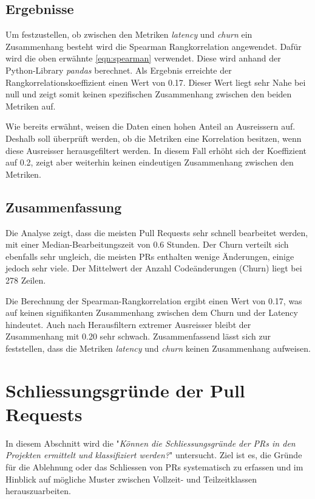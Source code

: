 \subsection{Ergebnisse}
Um festzustellen, ob zwischen den Metriken \textit{latency} und \textit{churn} ein Zusammenhang besteht wird die Spearman Rangkorrelation angewendet. Dafür wird die oben erwähnte \autoref{eqn:spearman} verwendet. Diese wird anhand der Python-Library \textit{pandas} berechnet. Als Ergebnis erreichte der Rangkorrelationskoeffizient einen Wert von 0.17. Dieser Wert liegt sehr Nahe bei null und zeigt somit keinen spezifischen Zusammenhang zwischen den beiden Metriken auf. 

Wie bereits erwähnt, weisen die Daten einen hohen Anteil an Ausreissern auf. Deshalb soll überprüft werden, ob die Metriken eine Korrelation besitzen, wenn diese Ausreisser herausgefiltert werden. In diesem Fall erhöht sich der Koeffizient auf 0.2, zeigt aber weiterhin keinen eindeutigen Zusammenhang zwischen den Metriken.

\subsection{Zusammenfassung}
Die Analyse zeigt, dass die meisten Pull Requests sehr schnell bearbeitet werden, mit einer Median-Bearbeitungszeit von 0.6 Stunden. Der Churn verteilt sich ebenfalls sehr ungleich, die meisten PRs enthalten wenige Änderungen, einige jedoch sehr viele. Der Mittelwert der Anzahl Codeänderungen (Churn) liegt bei 278 Zeilen.

Die Berechnung der Spearman-Rangkorrelation ergibt einen Wert von 0.17, was auf keinen signifikanten Zusammenhang zwischen dem Churn und der Latency hindeutet. Auch nach Herausfiltern extremer Ausreisser bleibt der Zusammenhang mit 0.20 sehr schwach.
Zusammenfassend lässt sich zur  feststellen, dass die Metriken \textit{latency} und \textit{churn} keinen Zusammenhang aufweisen.

\section{Schliessungsgründe der Pull Requests}
\label{sec:UntersuchungSchliessgründePRs} 
In diesem Abschnitt wird die  "\textit{Können die Schliessungsgründe der PRs in den Projekten ermittelt und klassifiziert werden?}" untersucht. Ziel ist es, die Gründe für die Ablehnung oder das Schliessen von PRs systematisch zu erfassen und im Hinblick auf  mögliche Muster zwischen Vollzeit- und Teilzeitklassen herauszuarbeiten.

